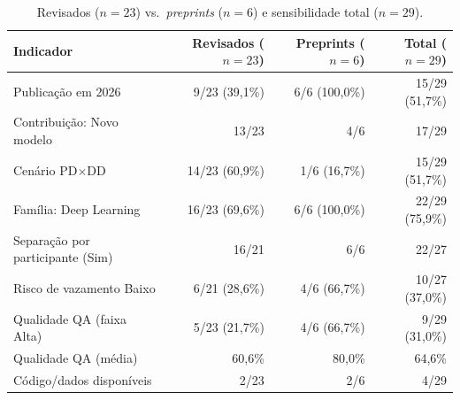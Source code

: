\begin{table}[htbp]
\centering
\caption{Revisados ($n=23$) vs.\ \textit{preprints} ($n=6$) e sensibilidade total ($n=29$).}
\label{tab:preprints}
{\scriptsize
\setlength{\tabcolsep}{3.5pt}
\renewcommand{\arraystretch}{0.74}
\begin{tabular*}{0.78\textwidth}{@{}l@{\extracolsep{\fill}} r r r@{}}
\toprule
\textbf{Indicador} & \textbf{Revisados ($n=23$)} & \textbf{Preprints ($n=6$)} & \textbf{Total ($n=29$)} \\
\midrule
Publicação em 2026 & 9/23 (39,1\%) & 6/6 (100,0\%) & 15/29 (51,7\%) \\
Contribuição: Novo modelo & 13/23 & 4/6 & 17/29 \\
Cenário PD$\times$DD & 14/23 (60,9\%) & 1/6 (16,7\%) & 15/29 (51,7\%) \\
Família: Deep Learning & 16/23 (69,6\%) & 6/6 (100,0\%) & 22/29 (75,9\%) \\
Separação por participante (Sim) & 16/21 & 6/6 & 22/27 \\
Risco de vazamento Baixo & 6/21 (28,6\%) & 4/6 (66,7\%) & 10/27 (37,0\%) \\
Qualidade QA (faixa Alta) & 5/23 (21,7\%) & 4/6 (66,7\%) & 9/29 (31,0\%) \\
Qualidade QA (média) & 60,6\% & 80,0\% & 64,6\% \\
Código/dados disponíveis & 2/23 & 2/6 & 4/29 \\
\bottomrule
\end{tabular*}
}
\end{table}
